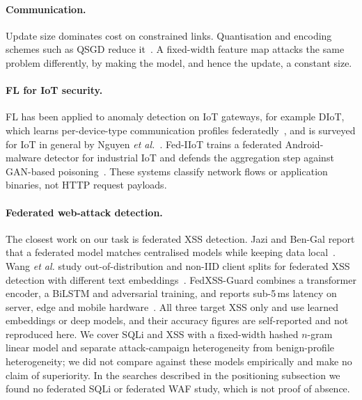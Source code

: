 \paragraph{Communication.}
Update size dominates cost on constrained links. Quantisation and encoding schemes such as QSGD reduce it~\cite{alistarh2017}. A fixed-width feature map attacks the same problem differently, by making the model, and hence the update, a constant size.

\paragraph{FL for IoT security.}
FL has been applied to anomaly detection on IoT gateways, for example DIoT, which learns per-device-type communication profiles federatedly~\cite{nguyen2019diot}, and is surveyed for IoT in general by Nguyen \textit{et al.}~\cite{nguyen2021}. Fed-IIoT trains a federated Android-malware detector for industrial IoT and defends the aggregation step against GAN-based poisoning~\cite{taheri2021fediiot}. These systems classify network flows or application binaries, not HTTP request payloads.

\paragraph{Federated web-attack detection.}
The closest work on our task is federated XSS detection. Jazi and Ben-Gal report that a federated model matches centralised models while keeping data local~\cite{jazi2024fedxss}. Wang \textit{et al.} study out-of-distribution and non-IID client splits for federated XSS detection with different text embeddings~\cite{wang2025fedxss}. FedXSS-Guard combines a transformer encoder, a BiLSTM and adversarial training, and reports sub-5\,ms latency on server, edge and mobile hardware~\cite{bharath2026fedxssguard}. All three target XSS only and use learned embeddings or deep models, and their accuracy figures are self-reported and not reproduced here. We cover SQLi and XSS with a fixed-width hashed $n$-gram linear model and separate attack-campaign heterogeneity from benign-profile heterogeneity; we did not compare against these models empirically and make no claim of superiority. In the searches described in the positioning subsection we found no federated SQLi or federated WAF study, which is not proof of absence.

